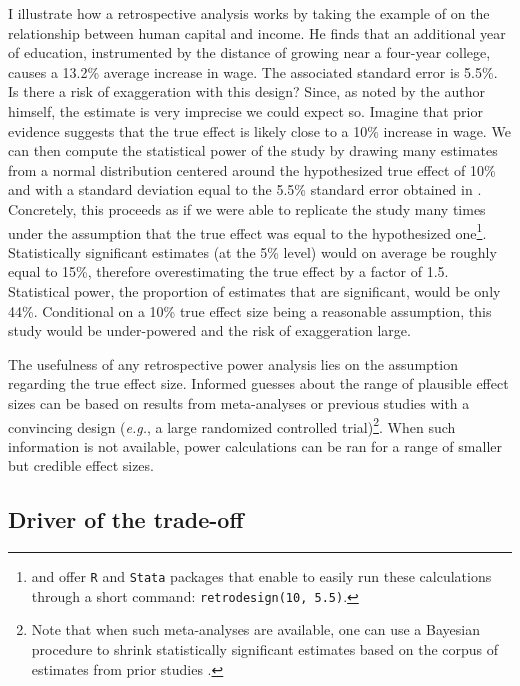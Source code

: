 \documentclass[usletter, 12pt]{article}
\begin{document}
				I illustrate how a retrospective analysis works by taking the example of \cite{card_using_1993} on the relationship between human capital and income. He finds that an additional year of education, instrumented by the distance of growing near a four-year college, causes a 13.2\% average increase in wage. The associated standard error is 5.5\%. Is there a risk of exaggeration with this design? Since, as noted by the author himself, the estimate is very imprecise we could expect so. Imagine that prior evidence suggests that the true effect is likely close to a 10\% increase in wage. We can then compute the statistical power of the study by drawing many estimates from a normal distribution centered around the hypothesized true effect of 10\% and with a standard deviation equal to the 5.5\% standard error obtained in \cite{card_using_1993}. Concretely, this proceeds as if we were able to replicate the study many times under the assumption that the true effect was equal to the hypothesized one\footnote{\cite{timm_retrodesign_2019} and \cite{linden_retrodesign_2019} offer \texttt{R} and \texttt{Stata} packages that enable to easily run these calculations through a short command: \texttt{retrodesign(10, 5.5)}.}. Statistically significant estimates (at the 5\% level) would on average be roughly equal to 15\%, therefore overestimating the true effect by a factor of 1.5. Statistical power, the proportion of estimates that are significant, would be only 44\%. Conditional on a 10\% true effect size being a reasonable assumption, this study would be under-powered and the risk of exaggeration large.
			
				The usefulness of any retrospective power analysis lies on the assumption regarding the true effect size. Informed guesses about the range of plausible effect sizes can be based on results from meta-analyses or previous studies with a convincing design (\textit{e.g.}, a large randomized controlled trial)\footnote{Note that when such meta-analyses are available, one can use a Bayesian procedure to shrink statistically significant estimates based on the corpus of estimates from prior studies \cite{zwet_proposal_2021, zwet_significance_2021, zwet_statistical_2021} .}. When such information is not available, power calculations can be ran for a range of smaller but credible effect sizes.
				
		\subsection{Driver of the trade-off}
		
\end{document}

